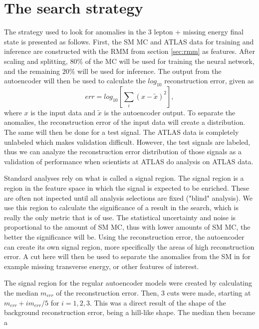 \section{The search strategy}\label{sec:strategy}
The strategy used to look for anomalies in the 3 lepton + missing energy final state is presented as follows. 
First, the SM MC and ATLAS data for training and inference are constructed with the RMM from section 
\ref{sec:rmm} as features. After scaling and splitting, $80\%$ of the MC will be used for training the neural 
network, and the remaining $20\%$ will be used for inference. The output from the autoencoder will then be used 
to calculate the $log_{10}$ reconstruction error, given as 
\begin{equation}\label{eq:rec_err}
    err = log_{10}\left[ \sum_i (x-\tilde{x})^2\right],
\end{equation}
where $x$ is the input data and $\tilde{x}$ is the autoencoder output. To separate the anomalies, the reconstruction 
error of the input data will create a distribution. The same will then be done for a test signal. The ATLAS data 
is completely unlabeled which makes validation difficult. However, the test signals are labeled, thus we can 
analyze the reconstruction error distribution of those signals as a validation of performance when scientists at 
ATLAS do analysis on ATLAS data. \par
Standard analyses rely on what is called a signal region. The signal region is a region in the feature space in which
the signal is expected to be enriched. These are often not inpected until all analysis selections are fixed ("blind" analysis). 
We use this region to calculate the significance of a result in the search, which is 
really the only metric that is of use. The statistical uncertainty and noise is proportional to the amount of SM MC, 
thus with lower amounts of SM MC, the better the significance will be. Using the reconstruction error, the autoencoder 
can create its own signal region, more specifically the areas of high reconstruction error. A cut here will then be used to 
separate the anomalies from the SM in for example missing transverse energy, or other features of interest. \par 
The signal region for the regular autoencoder models were created by calculating the median $m_{err}$ of the 
reconstruction error. Then, 3 cuts were made, starting at $m_{err} + im_{err}/5$ for $i = 1,2,3$. This was a direct 
result of the shape of the background reconstruction error, being a hill-like shape. The median then became a 
